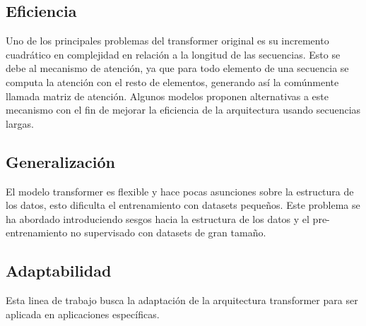 \subsection{Eficiencia}
Uno de los principales problemas del transformer original es su incremento cuadrático en complejidad en relación a la longitud de las secuencias. Esto se debe al mecanismo de atención, ya que para todo elemento de una secuencia se computa la atención con el resto de elementos, generando así la comúnmente llamada matriz de atención.
Algunos modelos proponen alternativas a este mecanismo con el fin de mejorar la eficiencia de la arquitectura usando secuencias largas.
\subsection{Generalización}
El modelo transformer es flexible y hace pocas asunciones sobre la estructura de los datos, esto dificulta el entrenamiento con datasets pequeños. Este problema se ha abordado introduciendo sesgos hacia la estructura de los datos y el pre-entrenamiento no supervisado con datasets de gran tamaño.
\subsection{Adaptabilidad}
Esta linea de trabajo busca la adaptación de la arquitectura transformer para ser aplicada en aplicaciones específicas.

